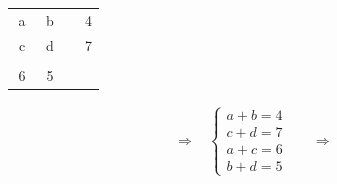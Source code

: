 \documentclass[report,12pt]{report}
\begin{document}
\begin{minipage}[t][][c]{.30\textwidth}
\centering
\begin{table}[H]
\centering
\begin{tabular}{c|cc|ccc}
\cline{1-4} \cline{6-6}
\multicolumn{2}{|c|}{\multirow{2}{*}{a}} & \multicolumn{2}{c|}{\multirow{2}{*}{b}} & \multicolumn{1}{c|}{} & \multicolumn{1}{c|}{\multirow{2}{*}{4}} \\ \cline{5-5}
\multicolumn{2}{|c|}{}                   & \multicolumn{2}{c|}{}                   & \multicolumn{1}{c|}{} & \multicolumn{1}{c|}{}                   \\ \cline{1-4} \cline{6-6} 
\multicolumn{2}{|c|}{\multirow{2}{*}{c}} & \multicolumn{2}{c|}{\multirow{2}{*}{d}} & \multicolumn{1}{c|}{} & \multicolumn{1}{c|}{\multirow{2}{*}{7}} \\ \cline{5-5}
\multicolumn{2}{|c|}{}                   & \multicolumn{2}{c|}{}                   & \multicolumn{1}{c|}{} & \multicolumn{1}{c|}{}                   \\ \cline{1-4} \cline{6-6} 
                    &                    &                    &                    &                       &                                         \\ \cline{1-4}
\multicolumn{2}{|c|}{6}                  & \multicolumn{2}{c|}{5}                  &                       &                                         \\ \cline{1-4}
\end{tabular}
\end{table}
\end{minipage}%
\begin{minipage}[t][][c]{.30\textwidth}
	\centering
  \begin{align}
  \Rightarrow\ \ \ \ \left\{
  \begin{array}{cc} 
  a+b=4 &  \\ 
  c+d=7 &  \\
  a+c=6 &  \\ 
  b+d=5 &  
  \end{array}\right. \ \ \ \ \Rightarrow\ \ \ \
  \nonumber
  \end{align}
\end{minipage}%
\end{document}
